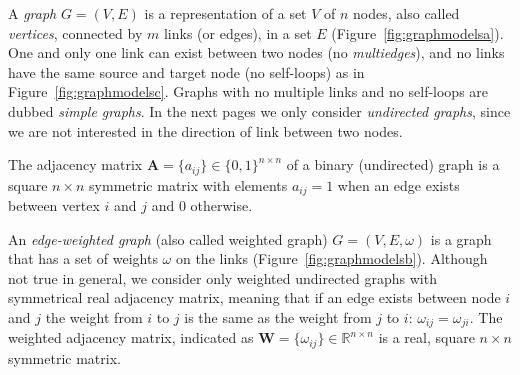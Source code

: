 A \emph{graph} $G=(V,E)$ is a representation of a set $V$ of $n$ nodes, also called \emph{vertices}, connected by $m$ links (or edges), in a set $E$ (Figure~\ref{fig:graphmodelsa}).
One and only one link can exist between two nodes (no \emph{multiedges}), and no links have the same source and target node (no self-loops) as in Figure~\ref{fig:graphmodelsc}.
Graphs with no multiple links and no self-loops are dubbed \emph{simple graphs}.
In the next pages we only consider \emph{undirected graphs}, since we are not interested in the direction of link between two nodes.

The adjacency matrix $\mathbf{A}=\{a_{ij}\} \in \{0,1\}^{n \times n}$ of a binary (undirected) graph is a square $n\times n$ symmetric matrix with elements $a_{ij}=1$ when an edge exists between vertex $i$ and $j$ and $0$ otherwise.

An \emph{edge-weighted graph} (also called weighted graph) $G=(V,E,\omega)$ is a graph that has a set of weights $\omega$ on the links (Figure~\ref{fig:graphmodelsb}). Although not true in general, we consider only weighted undirected graphs with symmetrical real adjacency matrix, meaning that if an edge exists between node $i$ and $j$ the weight from $i$ to $j$ is the same as the weight from $j$ to $i$: $\omega_{ij}=\omega_{ji}$. The weighted adjacency matrix,  indicated as $\mathbf{W}=\{ \omega_{ij} \} \in \mathbb{R}^{n\times n}$ is a real, square $n \times n$ symmetric matrix.


